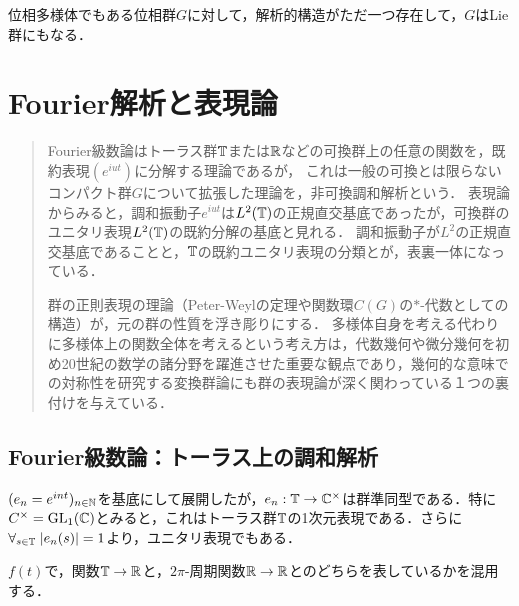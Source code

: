 \documentclass[uplatex,dvipdfmx]{jsreport}
\begin{document}
\begin{tcolorbox}[colframe=ForestGreen, colback=ForestGreen!10!white,breakable,colbacktitle=ForestGreen!40!white,coltitle=black,fonttitle=\bfseries\sffamily,
title=]
    位相多様体でもある位相群$G$に対して，解析的構造がただ一つ存在して，$G$はLie群にもなる．
\end{tcolorbox}

\chapter{Fourier解析と表現論}

\begin{quotation}
    Fourier級数論はトーラス群$\mathbb{T}$または$\mathbb{R}$などの可換群上の任意の関数を，既約表現$(e^{iut})$に分解する理論であるが，
    これは一般の可換とは限らないコンパクト群$G$について拡張した理論を，非可換調和解析という．
    表現論からみると，調和振動子$e^{iut}$は$L^2(\mathbb{T})$の正規直交基底であったが，可換群のユニタリ表現$L^2(\mathbb{T})$の既約分解の基底と見れる．
    調和振動子が$L^2$の正規直交基底であることと，$\mathbb{T}$の既約ユニタリ表現の分類とが，表裏一体になっている．

    群の正則表現の理論（Peter-Weylの定理や関数環$C(G)$の$*$-代数としての構造）が，元の群の性質を浮き彫りにする．
    多様体自身を考える代わりに多様体上の関数全体を考えるという考え方は，代数幾何や微分幾何を初め20世紀の数学の諸分野を躍進させた重要な観点であり，幾何的な意味での対称性を研究する変換群論にも群の表現論が深く関わっている１つの裏付けを与えている．
\end{quotation}

\section{Fourier級数論：トーラス上の調和解析}

\begin{tcolorbox}[colframe=ForestGreen, colback=ForestGreen!10!white,breakable,colbacktitle=ForestGreen!40!white,coltitle=black,fonttitle=\bfseries\sffamily,
title=]
    $(e_n=e^{int})_{n\in\mathbb{N}}$を基底にして展開したが，$e_n:\mathbb{T}\to\mathbb{C}^\times$は群準同型である．特に$C^\times=\mathrm{GL}_1(\mathbb{C})$とみると，これはトーラス群$\mathbb{T}$の1次元表現である．さらに$\forall_{s\in\mathbb{T}}\;\lvert e_n(s)\rvert=1$より，ユニタリ表現でもある．
\end{tcolorbox}

\begin{notation}
    $f(t)$で，関数$\mathbb{T}\to\mathbb{R}$と，$2\pi$-周期関数$\mathbb{R}\to\mathbb{R}$とのどちらを表しているかを混用する．
\end{notation}
\end{document}
